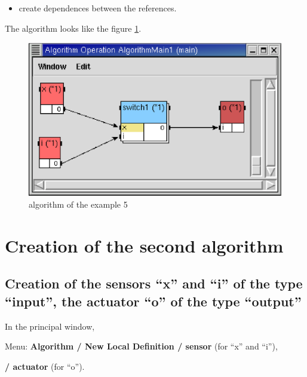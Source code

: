 \documentclass[a4paper,twoside]{report}
\begin{document}
\begin{itemize}
\begin{itemize}
\begin{itemize}
\end{itemize}

\item create dependences between the references.
\end{itemize}
\end{itemize}
The algorithm looks like the figure \ref{algo5}.

\begin{figure}[htbp]
  \begin{center} 
        \includegraphics[width=0.5\linewidth]{algorithm_ex5.eps} 
  \end{center}
  \caption{algorithm of the example 5}
  \label{algo5}
\end{figure}

\section{Creation of the second algorithm}
\subsection{Creation of the sensors ``x'' and ``i'' of the type ``input'',
the actuator ``o'' of the type ``output''}
In the principal window,

Menu: \textbf{Algorithm / New Local Definition / sensor} (for ``x'' and ``i''),

\hspace{172pt} \textbf{/ actuator} (for ``o'').
\end{document}
